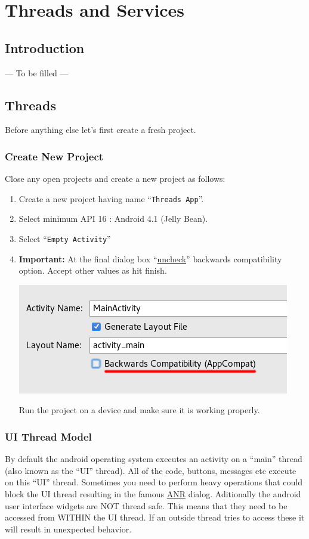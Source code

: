 \chapter{Threads and Services}
\label{TAS}

\section{Introduction}
\label{TAS:introduction}
--- To be filled ---

\section{Threads}
\label{TAS:threads}
Before anything else let's first create a fresh project.

\subsection{Create New Project}
\label{TAS:createNewProject1}
Close any open projects and create a new project as follows:
\begin{enumerate}
	\item Create a new project having name ``\texttt{Threads App}''.
	\item Select minimum API 16 : Android 4.1 (Jelly Bean).
	\item Select ``\texttt{Empty Activity}''
	\item \textbf{Important:} At the final dialog box ``\underline{uncheck}'' backwards compatibility option. Accept other values as hit finish.
	
	\begin{center}
		\includegraphics[scale=\SourceCodeScale]{chapters/ch14/images/1}
	\end{center}
	
	Run the project on a device and make sure it is working properly.
\end{enumerate}	

\subsection{UI Thread Model}
\label{TAS:uiThreadModel}
By default the android operating system executes an activity on a ``main'' thread (also known as the ``UI'' thread). All of the code, buttons, messages etc execute on this ``UI'' thread. Sometimes you need to perform heavy operations that could block the UI thread resulting in the famous \href{https://developer.android.com/training/articles/perf-anr.html}{ANR} dialog. Aditionally the android user interface widgets are NOT thread safe. This means that they need to be accessed from WITHIN the UI thread. If an outside thread tries to access these it will result in unexpected behavior. 

